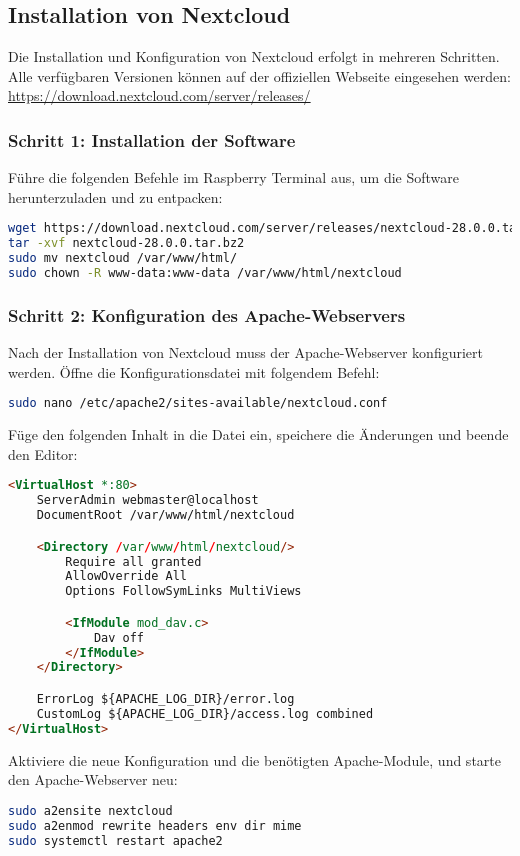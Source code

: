 \documentclass[a4paper,12pt]{article}
\begin{document}
\subsection{Installation von Nextcloud}
Die Installation und Konfiguration von Nextcloud erfolgt in mehreren Schritten. Alle verfügbaren Versionen können auf der offiziellen Webseite eingesehen werden:  
\url{https://download.nextcloud.com/server/releases/}

\subsubsection{Schritt 1: Installation der Software}
Führe die folgenden Befehle im Raspberry Terminal aus, um die Software herunterzuladen und zu entpacken:
\begin{lstlisting}[language=bash]
wget https://download.nextcloud.com/server/releases/nextcloud-28.0.0.tar.bz2
tar -xvf nextcloud-28.0.0.tar.bz2
sudo mv nextcloud /var/www/html/
sudo chown -R www-data:www-data /var/www/html/nextcloud
\end{lstlisting}

\subsubsection{Schritt 2: Konfiguration des Apache-Webservers}
Nach der Installation von Nextcloud muss der Apache-Webserver konfiguriert werden. Öffne die Konfigurationsdatei mit folgendem Befehl:
\begin{lstlisting}[language=bash]
sudo nano /etc/apache2/sites-available/nextcloud.conf
\end{lstlisting}
Füge den folgenden Inhalt in die Datei ein, speichere die Änderungen und beende den Editor:
\begin{lstlisting}[language=html]
<VirtualHost *:80>
    ServerAdmin webmaster@localhost
    DocumentRoot /var/www/html/nextcloud

    <Directory /var/www/html/nextcloud/>
        Require all granted
        AllowOverride All
        Options FollowSymLinks MultiViews

        <IfModule mod_dav.c>
            Dav off
        </IfModule>
    </Directory>

    ErrorLog ${APACHE_LOG_DIR}/error.log
    CustomLog ${APACHE_LOG_DIR}/access.log combined
</VirtualHost>
\end{lstlisting}

\noindent
Aktiviere die neue Konfiguration und die benötigten Apache-Module, und starte den Apache-Webserver neu:
\begin{lstlisting}[language=bash]
sudo a2ensite nextcloud
sudo a2enmod rewrite headers env dir mime
sudo systemctl restart apache2
\end{lstlisting}
\end{document}
